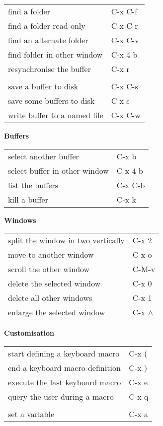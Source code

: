 \documentclass[10pt,a4paper,landscape]{article}
\begin{document}
\begin{multicols}{3}
  \begin{tabular}{p{2.00in}p{0.80in}}
    find a folder & C-x C-f \\
    find a folder read-only & C-x C-r \\
    find an alternate folder & C-x C-v \\
    find folder in other window & C-x 4 b \\
    resynchronise the buffer & C-x r \\
    & \\
    save a buffer to disk & C-x C-s \\
    save some buffers to disk & C-x s \\
    write buffer to a named file & C-x C-w \\
  \end{tabular}
  \vfill

  {\large \textbf{Buffers}}
  \nopagebreak

  \begin{tabular}{p{2.00in}p{0.80in}}
    select another buffer & C-x b \\
    select buffer in other window & C-x 4 b \\
    list the buffers & C-x C-b \\
    kill a buffer & C-x k \\
  \end {tabular}

  {\large \textbf{Windows}}
  \nopagebreak

  \begin{tabular}{p{2.00in}p{0.80in}}
    split the window in two vertically & C-x 2 \\
    move to another window & C-x o \\
    scroll the other window & C-M-v \\
    delete the selected window & C-x 0 \\
    delete all other windows & C-x 1 \\
    enlarge the selected window & C-x $\wedge$ \\
  \end{tabular}
  \vfill

  {\large \textbf{Customisation}}
  \nopagebreak

  \begin{tabular}{p{2.00in}p{0.80in}}
    start defining a keyboard macro & C-x ( \\
    end a keyboard macro definition & C-x ) \\
    execute the last keyboard macro & C-x e \\
    query the user during a macro & C-x q \\
    & \\
    set a variable & C-x a \\
  \end{tabular}

\end{multicols}
\end{document}
